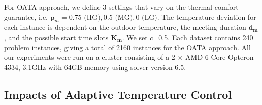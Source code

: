For OATA approach, we define 3 settings that vary on the thermal comfort guarantee, i.e. ${\bm p}_m = 0.75 \mbox{ (HG)}, 0.5 \mbox{ (MG)}, 0 \mbox{ (LG)}$. The temperature deviation for each instance is dependent on the outdoor temperature, the meeting duration $\bm{d_m}$, and the possible start time slots $\bm{K_m}$. We set $c$=0.5. Each dataset contains 240 problem instances, giving a total of 2160 instances for the OATA approach. %
All our experiments were run on a cluster consisting of a 2 $\times$ AMD 6-Core Opteron 4334, 3.1GHz with 64GB memory using \cite{gurobi} solver version 6.5.


\subsection{Impacts of Adaptive Temperature Control} \label{sec:atc_impacts}

